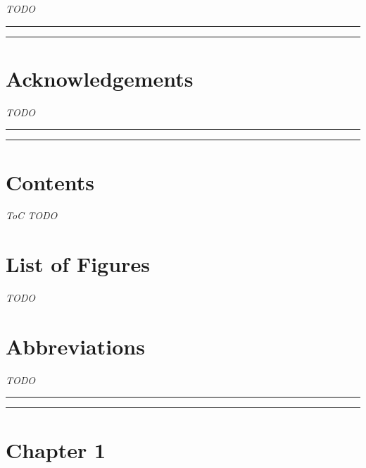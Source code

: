 \documentclass[12pt]{report}
\begin{document}
\emph{TODO}

\begin{center}\rule{0.5\linewidth}{\linethickness}\end{center}

\begin{center}\rule{0.5\linewidth}{\linethickness}\end{center}

\section{Acknowledgements}\label{acknowledgements}

\emph{TODO}

\begin{center}\rule{0.5\linewidth}{\linethickness}\end{center}

\begin{center}\rule{0.5\linewidth}{\linethickness}\end{center}

\section{Contents}\label{contents}

\emph{ToC TODO}

\section{List of Figures}\label{list-of-figures}

\emph{TODO}

\section{Abbreviations}\label{abbreviations}

\emph{TODO}

\begin{center}\rule{0.5\linewidth}{\linethickness}\end{center}

\begin{center}\rule{0.5\linewidth}{\linethickness}\end{center}

{
\setcounter{tocdepth}{3}
\tableofcontents
}

\section{Chapter 1}\label{chapter-1}
\end{document}
